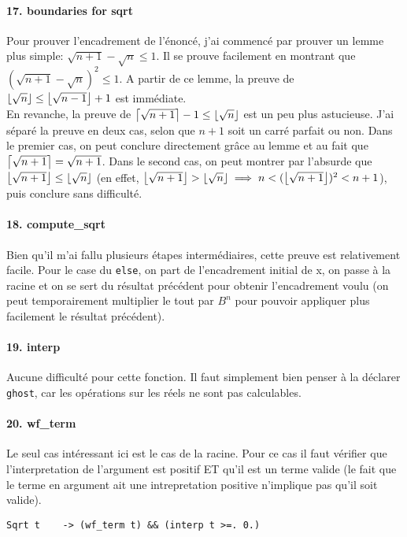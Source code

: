 \documentclass[a4paper]{article}%
\DeclarePairedDelimiter\ceil{\lceil}{\rceil}
\DeclarePairedDelimiter\floor{\lfloor}{\rfloor}
\begin{document}
	\paragraph{17. boundaries for sqrt} Pour prouver l'encadrement de l'énoncé, j'ai commencé par prouver un lemme plus simple:
	$\sqrt{n+1}-\sqrt{n}\leq 1$. Il se prouve facilement en montrant que $(\sqrt{n+1}-\sqrt{n})^2\leq 1$.
	A partir de ce lemme, la preuve de $\floor*{\sqrt{n}} \leq \floor*{\sqrt{n-1}}+1$ est immédiate.\\
	En revanche, la preuve de $\ceil*{\sqrt{n+1}}-1 \leq \floor*{\sqrt{n}}$ est un peu plus astucieuse.
	J'ai séparé la preuve en deux cas, selon que $n+1$ soit un carré parfait ou non. Dans le premier cas,
	on peut conclure directement grâce au lemme et au fait que $\ceil*{\sqrt{n+1}}=\sqrt{n+1}$.
	Dans le second cas, on peut montrer par l'absurde que $\floor*{\sqrt{n+1}}\leq \floor*{\sqrt{n}}$
	(en effet, $\floor*{\sqrt{n+1}} > \floor*{\sqrt{n}} \implies n < (\floor*{\sqrt{n+1}})^2 < n+1$),
	puis conclure sans difficulté.

	\paragraph{18. compute\_sqrt} Bien qu'il m'ai fallu plusieurs étapes intermédiaires, cette preuve est relativement
	facile. Pour le case du \texttt{else}, on part de l'encadrement initial de x, on passe à la racine et on se sert du résultat
	précédent pour obtenir l'encadrement voulu (on peut temporairement multiplier le tout par $B^n$ pour pouvoir appliquer plus
	facilement le résultat précédent).

	\paragraph{19. interp} Aucune difficulté pour cette fonction. Il faut simplement bien penser à la déclarer \texttt{ghost},
	car les opérations sur les réels ne sont pas calculables.

	\paragraph{20. wf\_term} Le seul cas intéressant ici est le cas de la racine. Pour ce cas il faut vérifier que l'interpretation
	de l'argument est positif ET qu'il est un terme valide (le fait que le terme en argument ait une intrepretation positive
	n'implique pas qu'il soit valide).
	\begin{verbatim}
Sqrt t    -> (wf_term t) && (interp t >=. 0.)
	\end{verbatim}
\end{document}
